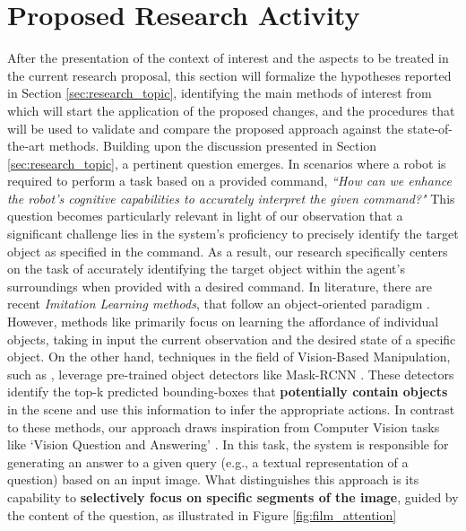 \section{Proposed Research Activity}
\label{sec:research_activity}
After the presentation of the context of interest and the aspects to be treated in the current research proposal, this section will formalize the hypotheses reported in Section \ref{sec:research_topic}, identifying the main methods of interest from which will start the application of the proposed changes, and the procedures that will be used to validate and compare the proposed approach against the state-of-the-art methods.
Building upon the discussion presented in Section \ref{sec:research_topic}, a pertinent question emerges. In scenarios where a robot is required to perform a task based on a provided command, \textit{``How can we enhance the robot's cognitive capabilities to accurately interpret the given command?"} This question becomes particularly relevant in light of our observation that a significant challenge lies in the system's proficiency to precisely identify the target object as specified in the command. As a result, our research specifically centers on the task of accurately identifying the target object within the agent's surroundings when provided with a desired command.
\newline In literature, there are recent \textit{Imitation Learning methods}, that follow an object-oriented paradigm \cite{park2021object, belkhale2023plato, zhu2023viola, jiang2023vima}. However, methods like \cite{belkhale2023plato} primarily focus on learning the affordance of individual objects, taking in input the current observation and the desired state of a specific object. On the other hand, techniques in the field of Vision-Based Manipulation, such as \cite{zhu2023viola, jiang2023vima}, leverage pre-trained object detectors like Mask-RCNN \cite{he2017mask}. These detectors identify the top-k predicted bounding-boxes that \textbf{potentially contain objects} in the scene and use this information to infer the appropriate actions. In contrast to these methods, our approach draws inspiration from Computer Vision tasks like `Vision Question and Answering' \cite{perez2018film}. In this task, the system is responsible for generating an answer to a given query (e.g., a textual representation of a question) based on an input image. What distinguishes this approach is its capability to \textbf{selectively focus on specific segments of the image}, guided by the content of the question, as illustrated in Figure \ref{fig:film_attention}
